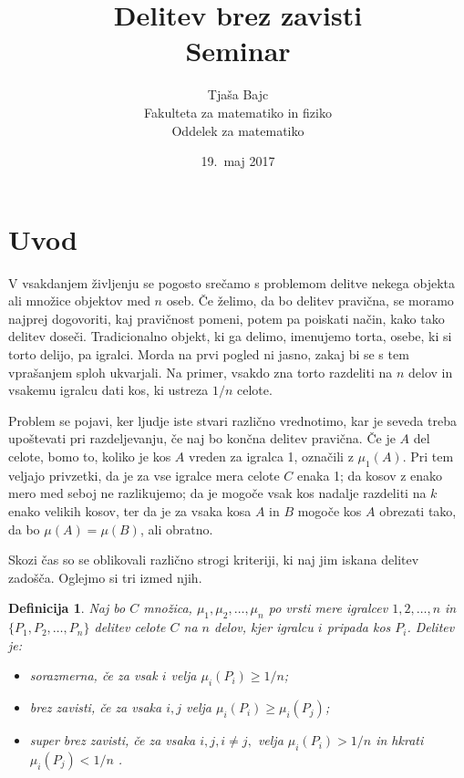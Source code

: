 \documentclass[a4paper,12pt]{article}
\title{Delitev brez zavisti \\ 
\Large Seminar}
\author{Tjaša Bajc \\
Fakulteta za matematiko in fiziko \\
Oddelek za matematiko}
\date{19.\ maj 2017}
\newtheorem{definicija}{Definicija}
\begin{document}


\maketitle



\section{Uvod}

V vsakdanjem življenju se pogosto srečamo s problemom delitve nekega objekta ali množice objektov med $n$ oseb. Če želimo, da bo delitev pravična, se moramo najprej dogovoriti, kaj pravičnost pomeni, potem pa poiskati način, kako tako delitev doseči. Tradicionalno objekt, ki ga delimo, imenujemo torta, osebe, ki si torto delijo, pa igralci. %
Morda na prvi pogled ni jasno, zakaj bi se s tem vprašanjem sploh ukvarjali. Na primer, vsakdo zna torto razdeliti na $n$ delov in vsakemu igralcu dati kos, ki ustreza $1/n$ celote. 

Problem se pojavi, ker ljudje iste stvari različno vrednotimo, kar je seveda treba upoštevati pri razdeljevanju, če naj bo končna delitev pravična. Če je $A$ del celote, bomo to, koliko je kos $A$ vreden za igralca 1, označili z $\mu_1(A)$. Pri tem veljajo privzetki, da je za vse igralce mera celote $C$ enaka 1; %
da kosov z enako mero med seboj ne razlikujemo; da je mogoče vsak kos nadalje razdeliti na $k$ enako velikih kosov, ter da je za vsaka kosa $A$ in $B$ mogoče kos $A$ obrezati tako, da bo $\mu(A) = \mu(B)$, ali obratno.


Skozi čas so se oblikovali različno strogi kriteriji, ki naj jim iskana delitev zadošča. Oglejmo si tri izmed njih.

\begin{definicija}
Naj bo $C$ množica, $\mu_1, \mu_2, \ldots, \mu_n$ po vrsti mere igralcev $1, 2, \ldots, n$ in $\{P_1, P_2, \ldots, P_n\}$ delitev celote $C$ na $n$ delov, kjer igralcu $i$ pripada kos $P_i$. Delitev je:

\begin{itemize}[noitemsep]
\item {\em sorazmerna\/}, če za vsak $i$ velja $\mu_i(P_i) \geq 1/n$;
\item {\em brez zavisti\/}, če za vsaka $i, j$ velja $\mu_i(P_i) \geq \mu_i(P_j)$;
\item{\em super brez zavisti\/}, če za vsaka $i, j, i \neq j,$ velja $\mu_i(P_i) > 1/n$ in hkrati $\mu_i(P_j) < 1/n$ .								
\end{itemize}

\end{definicija}
\end{document}
